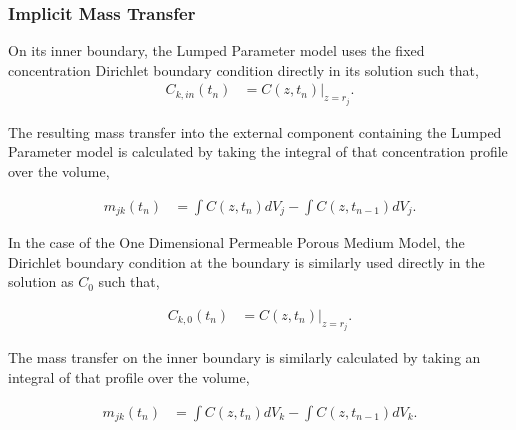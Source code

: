 \subsubsection{Implicit Mass Transfer}

On its inner boundary, the Lumped Parameter model uses the fixed concentration  
Dirichlet boundary condition directly in its solution such that, 
\begin{align}
C_{k,in}(t_n) &= C(z, t_n)|_{z=r_j}.
\end{align}

The resulting mass transfer into the external component containing the Lumped 
Parameter model is calculated by taking the integral of that concentration 
profile over the volume, 

\begin{align}
m_{jk}(t_n) &=\int C(z,t_n)dV_j - \int C(z, t_{n-1})dV_j.
\end{align}


In the case of the One Dimensional Permeable Porous Medium Model, 
the Dirichlet boundary condition at the boundary is similarly used directly in 
the solution as $C_0$ such that,

\begin{align}
  C_{k,0}(t_n) &= C(z, t_n)|_{z=r_j}.
\end{align}

The mass transfer on the inner boundary is similarly calculated by taking an 
integral of that profile over the volume,

\begin{align}
m_{jk}(t_n) &=\int C(z,t_n)dV_k - \int C(z, t_{n-1})dV_k.
\end{align}
